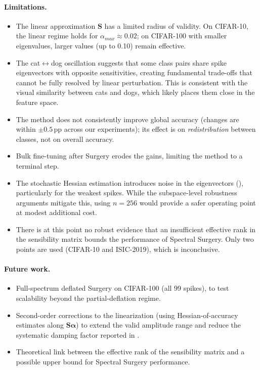 \documentclass[11pt,a4paper]{article}
\newcommand{\mat}[1]{\bm{#1}}
\newcommand{\vect}[1]{\bm{#1}}
\begin{document}
\paragraph{Limitations.}
\begin{itemize}
    \item The linear approximation $\mat{S}$ has a limited radius of validity. On CIFAR-10, the linear regime holds for $\alpha_{max} \approx 0.02$; on CIFAR-100 with smaller eigenvalues, larger values (up to 0.10) remain effective.
    \item The cat$\leftrightarrow$dog oscillation suggests that some
      class pairs share spike eigenvectors with opposite sensitivities,
      creating fundamental trade-offs that cannot be fully resolved by
      linear perturbation. This is consistent with the visual similarity
      between cats and dogs, which likely places them close in the
      feature space.
    \item The method does not consistently improve global accuracy
      (changes are within $\pm 0.5$\,pp across our experiments);
      its effect is on \emph{redistribution} between classes, not
      on overall accuracy.
    \item Bulk fine-tuning after Surgery erodes the gains, limiting the
      method to a terminal step.
    \item The stochastic Hessian estimation introduces noise in the
      eigenvectors (), particularly for
      the weakest spikes. While the subspace-level robustness arguments
      mitigate this, using $n = 256$ would provide a safer operating
      point at modest additional cost.
    \item There is at this point no robust evidence that an insufficient effective rank in the sensibility  matrix bounds the performance of Spectral Surgery. Only two points are used (CIFAR-10 and ISIC-2019), which is inconclusive.
\end{itemize}

\paragraph{Future work.}
\begin{itemize}
    \item Full-spectrum deflated Surgery on CIFAR-100 (all 99 spikes),
      to test scalability beyond the partial-deflation regime.
    \item Second-order corrections to the linearization (using
      Hessian-of-accuracy estimates along $\mat{S}\vect{\alpha}$) to
      extend the valid amplitude range and reduce the systematic
      damping factor reported in .
    \item Theoretical link between the effective rank of the sensibility matrix and a possible upper bound for Spectral Surgery performance. 
\end{itemize}
\end{document}

